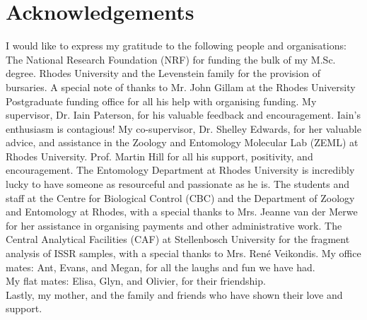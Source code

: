 \chapter*{Acknowledgements}
I would like to express my gratitude to the following people and organisations: \newline \\
The National Research Foundation (NRF) for funding the bulk of my M.Sc. degree. \newline 
Rhodes University and the Levenstein family for the provision of bursaries. \newline 
A special note of thanks to Mr. John Gillam at the Rhodes University Postgraduate funding office for all his help with organising funding. \newline 
My supervisor, Dr. Iain Paterson, for his valuable feedback and encouragement. Iain's enthusiasm is contagious! \newline
My co-supervisor, Dr. Shelley Edwards, for her valuable advice, and assistance in the Zoology and Entomology Molecular Lab (ZEML) at Rhodes University. \newline 
Prof. Martin Hill for all his support, positivity, and encouragement. The Entomology Department at Rhodes University is incredibly lucky to have someone as resourceful and passionate as he is. \newline 
The students and staff at the Centre for Biological Control (CBC) and the Department of Zoology and Entomology at Rhodes, with a special thanks to Mrs. Jeanne van der Merwe for her assistance in organising payments and other administrative work. \newline 
The Central Analytical Facilities (CAF) at Stellenbosch University for the fragment analysis of ISSR samples, with a special thanks to Mrs. Ren\'e Veikondis. \newline 
My office mates: Ant, Evans, and Megan, for all the laughs and fun we have had. \\
My flat mates: Elisa, Glyn, and Olivier, for their friendship. \\
Lastly, my mother, and the family and friends who have shown their love and support. 